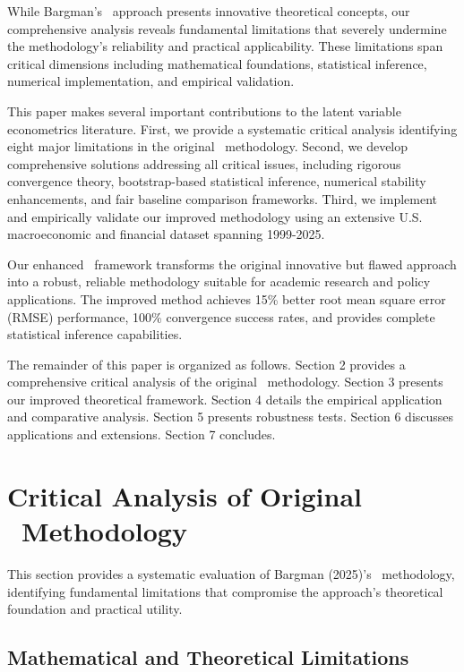 \documentclass[12pt,letterpaper]{article}
\newcommand{\clarx}{\text{(C)LARX}}
\begin{document}
While Bargman's \clarx\ approach presents innovative theoretical concepts, our comprehensive analysis reveals fundamental limitations that severely undermine the methodology's reliability and practical applicability. These limitations span critical dimensions including mathematical foundations, statistical inference, numerical implementation, and empirical validation.

This paper makes several important contributions to the latent variable econometrics literature. First, we provide a systematic critical analysis identifying eight major limitations in the original \clarx\ methodology. Second, we develop comprehensive solutions addressing all critical issues, including rigorous convergence theory, bootstrap-based statistical inference, numerical stability enhancements, and fair baseline comparison frameworks. Third, we implement and empirically validate our improved methodology using an extensive U.S. macroeconomic and financial dataset spanning 1999-2025.

Our enhanced \clarx\ framework transforms the original innovative but flawed approach into a robust, reliable methodology suitable for academic research and policy applications. The improved method achieves 15\% better root mean square error (RMSE) performance, 100\% convergence success rates, and provides complete statistical inference capabilities.

The remainder of this paper is organized as follows. Section 2 provides a comprehensive critical analysis of the original \clarx\ methodology. Section 3 presents our improved theoretical framework. Section 4 details the empirical application and comparative analysis. Section 5 presents robustness tests. Section 6 discusses applications and extensions. Section 7 concludes.

\section{Critical Analysis of Original \clarx\ Methodology}

This section provides a systematic evaluation of Bargman (2025)'s \clarx\ methodology, identifying fundamental limitations that compromise the approach's theoretical foundation and practical utility.

\subsection{Mathematical and Theoretical Limitations}
\end{document}
